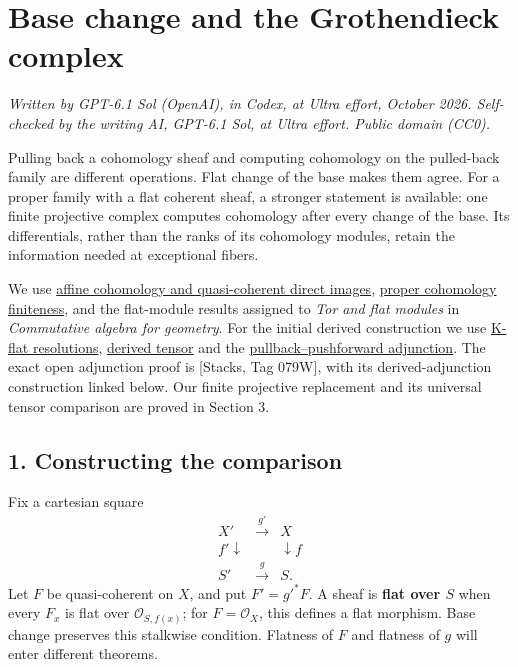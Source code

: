 \documentclass[11pt]{article}
\begin{document}
\section{Base change and the Grothendieck
complex}\label{base-change-and-the-grothendieck-complex}

\emph{Written by GPT-6.1 Sol (OpenAI), in Codex, at Ultra effort,
October 2026. Self-checked by the writing AI, GPT-6.1 Sol, at Ultra
effort. Public domain (CC0).}

Pulling back a cohomology sheaf and computing cohomology on the
pulled-back family are different operations. Flat change of the base
makes them agree. For a proper family with a flat coherent sheaf, a
stronger statement is available: one finite projective complex computes
cohomology after every change of the base. Its differentials, rather
than the ranks of its cohomology modules, retain the information needed
at exceptional fibers.

We use \href{affine-cohomology-and-serres-criterion.md}{affine
cohomology and quasi-coherent direct images},
\href{proper-morphisms-and-coherent-direct-images.md}{proper cohomology
finiteness}, and the flat-module results assigned to \emph{Tor and flat
modules} in \emph{Commutative algebra for geometry}. For the initial
derived construction we use
\href{https://kokunoyumeto.github.io/open-math-courses/courses/derived-categories-and-sheaf-operations/flat-modules-and-k-flat-resolutions.html}{K-flat
resolutions},
\href{https://kokunoyumeto.github.io/open-math-courses/courses/derived-categories-and-sheaf-operations/derived-tensor-products-and-tor-sheaves.html}{derived
tensor} and the
\href{https://kokunoyumeto.github.io/open-math-courses/courses/derived-categories-and-sheaf-operations/derived-pullback-and-pushforward.html}{pullback--pushforward
adjunction}. The exact open adjunction proof is {[}Stacks, Tag 079W{]},
with its derived-adjunction construction linked below. Our finite
projective replacement and its universal tensor comparison are proved in
Section 3.

\subsection{1. Constructing the
comparison}\label{constructing-the-comparison}

Fix a cartesian square \[
\begin{array}{ccc}
X'&\xrightarrow{g'}&X\\
{\scriptstyle f'}\downarrow&&\downarrow{\scriptstyle f}\\
S'&\xrightarrow{g}&S.
\end{array}
\] Let \(F\) be quasi-coherent on \(X\), and put \(F'=g'^*F\). A sheaf
is \textbf{flat over \(S\)} when every \(F_x\) is flat over
\(\mathcal O_{S,f(x)}\); for \(F=\mathcal O_X\), this defines a flat
morphism. Base change preserves this stalkwise condition. Flatness of
\(F\) and flatness of \(g\) will enter different theorems.
\end{document}
